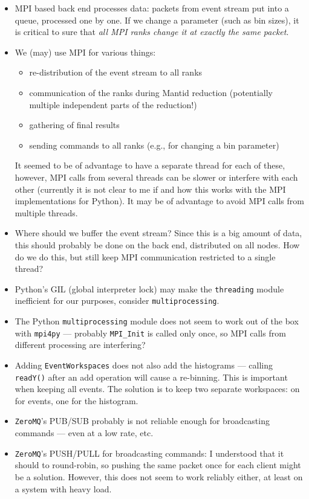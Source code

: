 \documentclass[a4paper,english,numbers=noenddot,bibliography=totoc,chapterprefix=on,DIV=12]{scrartcl}
\newcommand{\zmq}{\texttt{ZeroMQ}\xspace}
\begin{document}
\begin{itemize}
  \item MPI based back end processes data: packets from event stream put into a queue, processed one by one.
    If we change a parameter (such as bin sizes), it is critical to sure that \emph{all MPI ranks change it at exactly the same packet}.
  \item We (may) use MPI for various things:
    \begin{itemize}
      \item re-distribution of the event stream to all ranks
      \item communication of the ranks during Mantid reduction (potentially multiple independent parts of the reduction!)
      \item gathering of final results
      \item sending commands to all ranks (e.g., for changing a bin parameter)
    \end{itemize}
    It seemed to be of advantage to have a separate thread for each of these, however, MPI calls from several threads can be slower or interfere with each other (currently it is not clear to me if and how this works with the MPI implementations for Python).
    It may be of advantage to avoid MPI calls from multiple threads.
  \item Where should we buffer the event stream?
    Since this is a big amount of data, this should probably be done on the back end, distributed on all nodes.
    How do we do this, but still keep MPI communication restricted to a single thread?
  \item Python's GIL (global interpreter lock) may make the \texttt{threading} module inefficient for our purposes, consider \texttt{multiprocessing}.
  \item The Python \texttt{multiprocessing} module does not seem to work out of the box with \texttt{mpi4py} --- probably \texttt{MPI\_Init} is called only once, so MPI calls from different processing are interfering?
  \item Adding \texttt{EventWorkspaces} does not also add the histograms --- calling \texttt{readY()} after an add operation will cause a re-binning.
    This is important when keeping all events.
    The solution is to keep two separate workspaces: on for events, one for the histogram.
  \item \zmq's PUB/SUB probably is not reliable enough for broadcasting commands --- even at a low rate, etc.
  \item \zmq's PUSH/PULL for broadcasting commands: I understood that it should to round-robin, so pushing the same packet once for each client might be a solution.
    However, this does not seem to work reliably either, at least on a system with heavy load.
\end{itemize}
\end{document}
